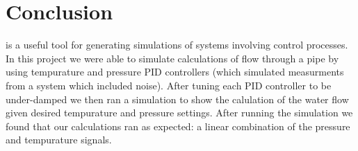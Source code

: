 \documentclass[main.tex]{subfile}
\begin{document}
\section{Conclusion} 
\label{sec:conclusion}

\Labview is a useful tool for generating simulations of systems involving
control processes. In this project we were able to simulate calculations of flow
through a pipe by using tempurature and pressure PID controllers (which
simulated measurments from a system which included noise). After tuning each PID
controller to be under-damped we then ran a simulation to show the calulation of
the water flow given desired tempurature and pressure settings. After running
the simulation we found that our calculations ran as expected: a linear
combination of the pressure and tempurature signals.

\end{document}
